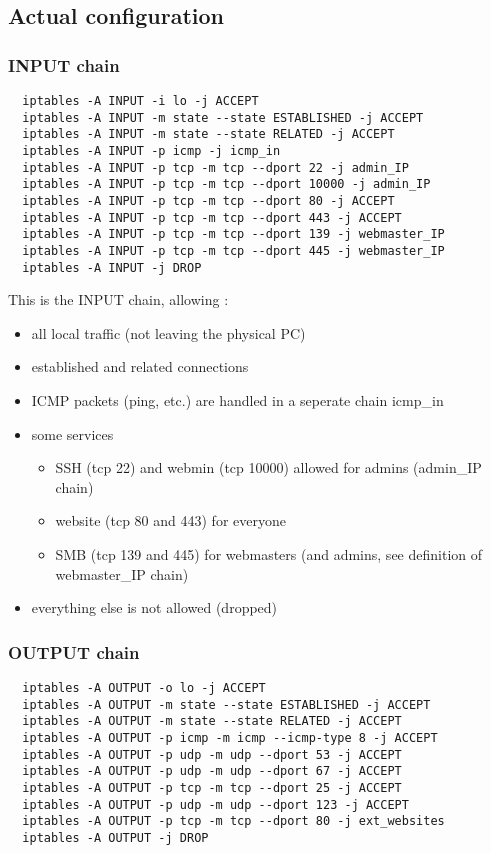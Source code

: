 \documentclass[a4paper,12pt]{article}
\begin{document}
\subsection{Actual configuration}

\subsubsection{INPUT chain}

\begin{verbatim}
  iptables -A INPUT -i lo -j ACCEPT
  iptables -A INPUT -m state --state ESTABLISHED -j ACCEPT
  iptables -A INPUT -m state --state RELATED -j ACCEPT
  iptables -A INPUT -p icmp -j icmp_in
  iptables -A INPUT -p tcp -m tcp --dport 22 -j admin_IP
  iptables -A INPUT -p tcp -m tcp --dport 10000 -j admin_IP
  iptables -A INPUT -p tcp -m tcp --dport 80 -j ACCEPT
  iptables -A INPUT -p tcp -m tcp --dport 443 -j ACCEPT
  iptables -A INPUT -p tcp -m tcp --dport 139 -j webmaster_IP
  iptables -A INPUT -p tcp -m tcp --dport 445 -j webmaster_IP
  iptables -A INPUT -j DROP
\end{verbatim}

This is the INPUT chain, allowing :
\begin{itemize}
  \item all local traffic (not leaving the physical PC)
  \item established and related connections
  \item ICMP packets (ping, etc.) are handled in a seperate chain icmp\_in
  \item some services
  \begin{itemize}
    \item SSH (tcp 22) and webmin (tcp 10000) allowed for admins (admin\_IP chain)
    \item website (tcp 80 and 443) for everyone
    \item SMB (tcp 139 and 445) for webmasters (and admins, see definition of webmaster\_IP chain)
  \end{itemize}
  \item everything else is not allowed (dropped)
\end{itemize}

\subsubsection{OUTPUT chain}

\begin{verbatim}
  iptables -A OUTPUT -o lo -j ACCEPT
  iptables -A OUTPUT -m state --state ESTABLISHED -j ACCEPT
  iptables -A OUTPUT -m state --state RELATED -j ACCEPT
  iptables -A OUTPUT -p icmp -m icmp --icmp-type 8 -j ACCEPT
  iptables -A OUTPUT -p udp -m udp --dport 53 -j ACCEPT
  iptables -A OUTPUT -p udp -m udp --dport 67 -j ACCEPT
  iptables -A OUTPUT -p tcp -m tcp --dport 25 -j ACCEPT
  iptables -A OUTPUT -p udp -m udp --dport 123 -j ACCEPT
  iptables -A OUTPUT -p tcp -m tcp --dport 80 -j ext_websites
  iptables -A OUTPUT -j DROP
\end{verbatim}
\end{document}
